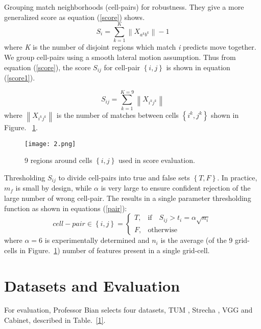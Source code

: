 \documentclass[twocolumn]{article}
\begin{document}
	Grouping match neighborhoods (cell-pairs) for robustness. They give a more generalized score as equation (\ref{score}) shows.
	\begin{equation}
     S_i = \sum_{k=1}^{K} \left\| X_{a^k b^k} \right\|-1 \label{score}
	\end{equation}
	where \emph{K} is the number of disjoint regions which match \emph{i} predicts move together.
	We group cell-pairs using a smooth lateral motion assumption. Thus from equation (\ref{score}), the score $S_{ij}$ for cell-pair $ \left\{i,j \right\} $ is shown in equation (\ref{score1}).
	
	\begin{equation}
	S_{ij} = \sum_{k=1}^{K=9} \left\| X_{i^k j^k} \right\| \label{score1}
	\end{equation}
	where $\left\| X_{i^k j^k} \right\|$ is the number of matches between cells
	$ \left\{i^k,j^k\right\} $ shown in Figure. ~\ref{cell}.

	\begin{figure}[ht]
		\centering
		\texttt{[image: 2.png]}
		\caption{9 regions around cells $ \left\{i,j\right\} $ used in score evaluation.}\label{cell}
	\end{figure}
	
	Thresholding $S_{ij}$ to divide cell-pairs into true and false sets $ \left\{T,F\right\} $. In practice, $m_{f}$ is small by design, while $\alpha$ is very large to ensure confident rejection of the large number of wrong cell-pair. The results in a single parameter thresholding function as shown in equations (\ref{pair}):
	\begin{equation}
	cell-pair \in \left\{i,j\right\}=
	\begin{cases}
	T, & \mbox{if} \quad S_{ij} > t_{i} = \alpha \sqrt{n_{i}} \\
	F, & \mbox{otherwise}
	\end{cases}   \label{pair}
	\end{equation}
	where $\alpha = 6$ is experimentally determined and $n_{i}$ is the average (of the 9 grid-cells in Figure.~\ref{cell}) number of features present in a single grid-cell.
	
	\section{Datasets and Evaluation}
	For evaluation, Professor Bian selects four datasets, TUM \cite{Sturm2012A}, Strecha \cite{Strecha2008On}, VGG \cite{Mikolajczyk2005A} and Cabinet\cite{Sturm2012A}, described in Table.~\ref{1}. 
	
\end{document}
